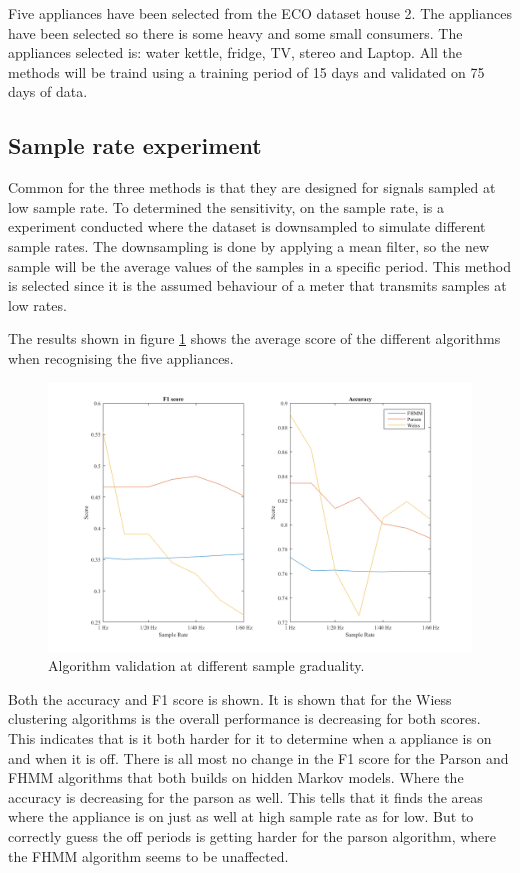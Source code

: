 Five appliances have been selected from the ECO dataset house 2. The appliances have been selected so there is some heavy and some small consumers. The appliances selected is: water kettle, fridge, TV, stereo and Laptop. All the methods will be traind using a training period of 15 days and validated on 75 days of data. 

\subsection{Sample rate experiment}
Common for the three methods is that they are designed for signals sampled at low sample rate. To determined the sensitivity, on the sample rate, is a experiment conducted where the dataset is downsampled to simulate different sample rates. The downsampling is done by applying a mean filter, so the new sample will be the average values of the samples in a specific period. This method is selected since it is the assumed behaviour of a meter that transmits samples at low rates. 

The results shown in figure \ref{fig:DSE} shows the average score of the different algorithms when recognising the five appliances. 

\begin{figure}[H]
\centering
\includegraphics[width=1\textwidth]{billeder/AlgoScoreNilm.png}
\caption{Algorithm validation at different sample graduality.}
\label{fig:DSE}
\end{figure}

Both the accuracy and F1 score is shown. It is shown that for the Wiess clustering algorithms is the overall performance is decreasing for both scores. This indicates that is it both harder for it to determine when a appliance is on and when it is off. There is all most no change in the F1 score for the Parson and FHMM algorithms that both builds on hidden Markov models. Where the accuracy is decreasing for the parson as well. This tells that it finds the areas where the appliance is on just as well at high sample rate as for low. But to correctly guess the off periods is getting harder for the parson algorithm, where the FHMM algorithm seems to be unaffected. 

